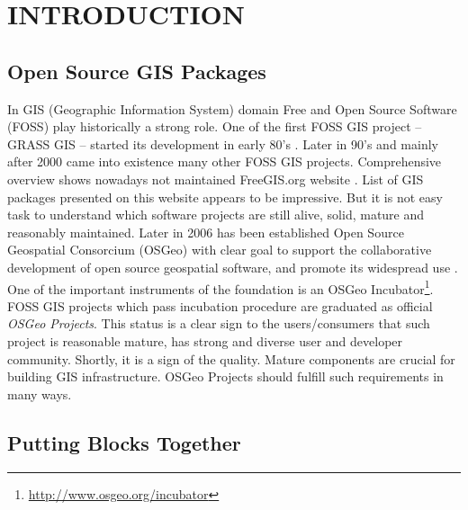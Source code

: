 \documentclass{isprs}
\begin{document}

\maketitle


\section{INTRODUCTION}\label{INTRODUCTION}

\sloppy

\subsection{Open Source GIS Packages}\label{sec:Open Source GIS Packages}

In GIS (Geographic Information System) domain Free and Open Source
Software (FOSS) play historically a strong role. One of the first FOSS
GIS project -- GRASS GIS -- started its development in early 80's
\cite{neteler-metz-bowman-landa.2012:Elsevier}. Later in 90's and
mainly after 2000 came into existence many other FOSS GIS
projects. Comprehensive overview shows nowadays not maintained
FreeGIS.org website \cite{freegis.org}. List of GIS packages presented
on this website appears to be impressive. But it is not easy task to
understand which software projects are still alive, solid, mature and
reasonably maintained. Later in 2006 has been established Open Source
Geospatial Consorcium (OSGeo) with clear goal to support the
collaborative development of open source geospatial software, and
promote its widespread use \cite{osgeo.org}. One of the important
instruments of the foundation is an OSGeo
Incubator\footnote{\url{http://www.osgeo.org/incubator}}. FOSS GIS
projects which pass incubation procedure are graduated as official
\textit{OSGeo Projects}. This status is a clear sign to the
users/consumers that such project is reasonable mature, has strong and
diverse user and developer community. Shortly, it is a sign of the
quality. Mature components are crucial for building GIS
infrastructure. OSGeo Projects should fulfill such requirements in
many ways.

\subsection{Putting Blocks Together}\label{sec:Putting blocks together}
\end{document}
